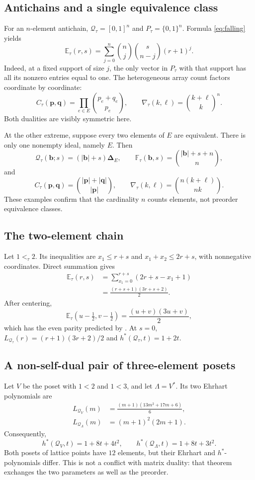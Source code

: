 \documentclass[11pt,letterpaper]{article}
\theoremstyle{definition}
\newcommand{\bvec}{\mathbf b}
\newcommand{\pvec}{\mathbf p}
\newcommand{\qvec}{\mathbf q}
\newcommand{\QQ}{\mathcal Q}
\newcommand{\EE}{\mathbb E}
\newcommand{\FF}{\mathbb F}
\newcommand{\ds}{\boldsymbol\Delta}
\newcommand{\sumv}[1]{\lvert #1\rvert}
\begin{document}
\subsection{Antichains and a single equivalence class}
For an $n$-element antichain, $\QQ_\tau=[0,1]^n$ and
$P_\tau=\{0,1\}^n$. Formula \eqref{eq:falling} yields
\begin{equation}\label{eq:antichain-double}
 \EE_\tau(r,s)=\sum_{j=0}^n\binom nj\binom{s}{n-j}(r+1)^j.
\end{equation}
Indeed, at a fixed support of size $j$, the only vector in $P_\tau$ with
that support has all its nonzero entries equal to one. The heterogeneous
array count factors coordinate by coordinate:
\[
 C_\tau(\pvec,\qvec)=\prod_{e\in E}\binom{p_e+q_e}{p_e},\qquad
 \nabla_\tau(k,\ell)=\binom{k+\ell}{k}^{\!n}.
\]
Both dualities are visibly symmetric here.

At the other extreme, suppose every two elements of $E$ are equivalent.
There is only one nonempty ideal, namely $E$. Then
\[
 \QQ_\tau(\bvec;s)=(\sumv{\bvec}+s)\ds_E,\qquad
 \FF_\tau(\bvec,s)=\binom{\sumv{\bvec}+s+n}{n},
\]
and
\[
 C_\tau(\pvec,\qvec)=\binom{\sumv{\pvec}+\sumv{\qvec}}{\sumv{\pvec}},
 \qquad
 \nabla_\tau(k,\ell)=\binom{n(k+\ell)}{nk}.
\]
These examples confirm that the cardinality $n$ counts elements, not
preorder equivalence classes.

\subsection{The two-element chain}
Let $1<_{\tau}2$. Its inequalities are
$x_1\leq r+s$ and $x_1+x_2\leq2r+s$, with nonnegative coordinates.
Direct summation gives
\begin{align*}
 \EE_\tau(r,s)
 &=\sum_{x_1=0}^{r+s}(2r+s-x_1+1)\\
 &=\frac{(r+s+1)(3r+s+2)}2.
\end{align*}
After centering,
\[
 \EE_\tau(u-\tfrac12,v-\tfrac12)=\frac{(u+v)(3u+v)}2,
\]
which has the even parity predicted by . At $s=0$,
$L_{\QQ_\tau}(r)=(r+1)(3r+2)/2$ and $h^*(\QQ_\tau,t)=1+2t$.

\subsection{A non-self-dual pair of three-element posets}
Let $V$ be the poset with $1<2$ and $1<3$, and let $\Lambda=V^*$.
Its two Ehrhart polynomials are
\begin{align}
 L_{\QQ_V}(m)&=\frac{(m+1)(13m^2+17m+6)}6,\label{eq:forkL}\\
 L_{\QQ_\Lambda}(m)&=(m+1)^2(2m+1).
\end{align}
Consequently,
\[
 h^*(\QQ_V,t)=1+8t+4t^2,\qquad
 h^*(\QQ_\Lambda,t)=1+8t+3t^2.
\]
Both posets of lattice points have $12$ elements, but their Ehrhart and
$h^*$-polynomials differ. This is not a conflict with matrix duality:
that theorem exchanges the two parameters as well as the preorder.
\end{document}
